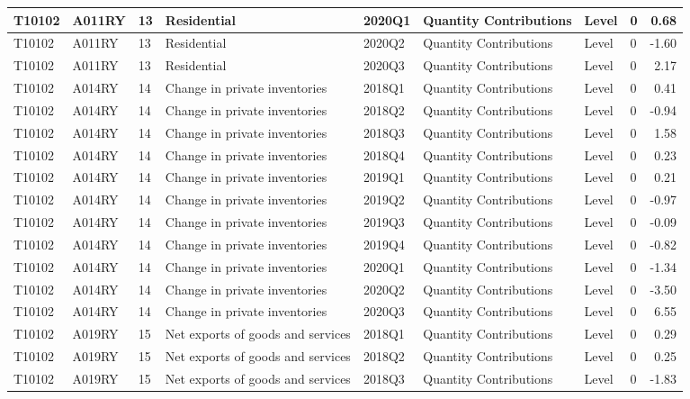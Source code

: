 \documentclass[
]{article}
\begin{document}
\begin{tabular}{l|l|l|l|l|l|l|l|r}
\hline
T10102 & A011RY & 13 & Residential & 2020Q1 & Quantity Contributions & Level & 0 & 0.68\\
\hline
T10102 & A011RY & 13 & Residential & 2020Q2 & Quantity Contributions & Level & 0 & -1.60\\
\hline
T10102 & A011RY & 13 & Residential & 2020Q3 & Quantity Contributions & Level & 0 & 2.17\\
\hline
T10102 & A014RY & 14 & Change in private inventories & 2018Q1 & Quantity Contributions & Level & 0 & 0.41\\
\hline
T10102 & A014RY & 14 & Change in private inventories & 2018Q2 & Quantity Contributions & Level & 0 & -0.94\\
\hline
T10102 & A014RY & 14 & Change in private inventories & 2018Q3 & Quantity Contributions & Level & 0 & 1.58\\
\hline
T10102 & A014RY & 14 & Change in private inventories & 2018Q4 & Quantity Contributions & Level & 0 & 0.23\\
\hline
T10102 & A014RY & 14 & Change in private inventories & 2019Q1 & Quantity Contributions & Level & 0 & 0.21\\
\hline
T10102 & A014RY & 14 & Change in private inventories & 2019Q2 & Quantity Contributions & Level & 0 & -0.97\\
\hline
T10102 & A014RY & 14 & Change in private inventories & 2019Q3 & Quantity Contributions & Level & 0 & -0.09\\
\hline
T10102 & A014RY & 14 & Change in private inventories & 2019Q4 & Quantity Contributions & Level & 0 & -0.82\\
\hline
T10102 & A014RY & 14 & Change in private inventories & 2020Q1 & Quantity Contributions & Level & 0 & -1.34\\
\hline
T10102 & A014RY & 14 & Change in private inventories & 2020Q2 & Quantity Contributions & Level & 0 & -3.50\\
\hline
T10102 & A014RY & 14 & Change in private inventories & 2020Q3 & Quantity Contributions & Level & 0 & 6.55\\
\hline
T10102 & A019RY & 15 & Net exports of goods and services & 2018Q1 & Quantity Contributions & Level & 0 & 0.29\\
\hline
T10102 & A019RY & 15 & Net exports of goods and services & 2018Q2 & Quantity Contributions & Level & 0 & 0.25\\
\hline
T10102 & A019RY & 15 & Net exports of goods and services & 2018Q3 & Quantity Contributions & Level & 0 & -1.83\\

\end{tabular}
\end{document}
